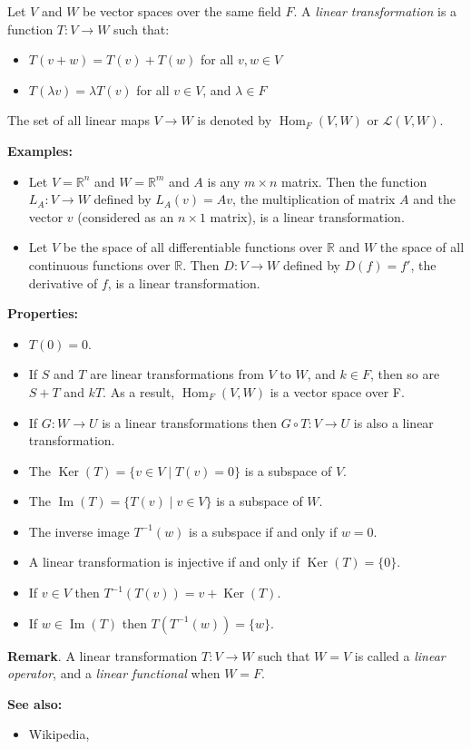 \documentclass[12pt]{article}
\def\Ker{\operatorname{Ker}}
\def\Im{\operatorname{Im}}
\def\Hom{\operatorname{Hom}}
\begin{document}

Let $V$ and $W$ be vector spaces over the same field $F$. A \emph{linear transformation} is a function $T\colon V \to W$ such that:
\begin{itemize}
  \item $T(v+w) = T(v)+T(w)$ for all $v,w \in V$
  \item $T(\lambda v) = \lambda T(v)$ for all $v\in V$, and $\lambda \in F$
\end{itemize}
The set of all linear maps $V \to W$ is denoted by $\Hom_F(V,W)$ or $\mathscr{L}(V,W)$.

\textbf{Examples:}
\begin{itemize}
\item Let $V=\mathbb{R}^n$ and $W=\mathbb{R}^m$ and $A$ is any $m\times n$ matrix.  Then the function $L_A:V\to W$ defined by $L_A(v)=Av$, the multiplication of matrix $A$ and the vector $v$ (considered as an $n\times 1$ matrix), is a linear transformation.
\item Let $V$ be the space of all differentiable functions over $\mathbb{R}$ and $W$ the space of all continuous functions over $\mathbb{R}$.  Then $D:V\to W$ defined by $D(f)=f'$, the derivative of $f$, is a linear transformation.
\end{itemize}

\noindent \textbf{Properties:}
\begin{itemize}
  \item $T(0) = 0$.
  \item If $S$ and $T$ are linear transformations from $V$ to $W$, and $k\in F$, then so are $S+T$ and $kT$.  As a result, $\Hom_F(V,W)$ is a vector space over F.
  \item If $G\colon W\to U$ is a linear transformations then $G\circ T\colon V\to U$ is also a linear transformation.
  \item The 
$\Ker(T)=\{v\in V \mid T(v) = 0\}$ is a subspace of $V$.
  \item The  $\Im(T) = \{T(v) \mid v\in V\}$ is a subspace of $W$.
  \item The inverse image $T^{-1}(w)$ is a subspace if and only if $w=0$.
  \item A linear transformation is injective if and only if $\Ker(T)=\{0\}$.
  \item If $v \in V$ then $T^{-1}(T(v)) = v + \Ker(T)$.
  \item If $w\in \Im(T)$ then $T(T^{-1}(w)) = \{w\}$.
\end{itemize}

\textbf{Remark}.  A linear transformation $T:V\to W$ such that $W=V$ is called a \emph{linear operator}, and a \emph{linear functional} when $W=F$.

\textbf{See also:}
\begin{itemize}
\item Wikipedia, 
\end{itemize}
\end{document}
